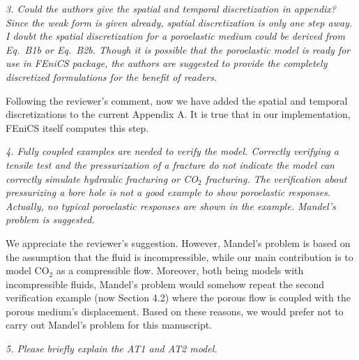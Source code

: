 \documentclass{elsarticle}
\newcommand{\review}[1]{ \textit{#1}}
\begin{document}
{{%
\bigskip

    \review{3. Could the authors give the spatial and temporal discretization in appendix? Since the weak form is given already, spatial discretization is only one step away. I doubt the spatial discretization for a poroelastic medium could be derived from Eq.~B1b or Eq.~B2b. Though it is possible that the poroelastic model is ready for use in FEniCS package, the authors are suggested to provide the completely discretized formulations for the benefit of readers.}
    
{Following the reviewer's comment, now we have added the spatial and temporal discretizations to the current Appendix A. It is true that in our implementation, FEniCS itself computes this step.}

\bigskip
    \review{4. Fully coupled examples are needed to verify the model. Correctly verifying a tensile test and the pressurization of a fracture do not indicate the model can correctly simulate hydraulic fracturing or CO$_2$ fracturing. The verification about pressurizing a bore hole is not a good example to show poroelastic responses. Actually, no typical poroelastic responses are shown in the example. Mandel's problem is suggested.}




We appreciate the reviewer's suggestion. However, Mandel's problem is based on the assumption that the fluid is incompressible, while our main contribution is to model CO$_2$ as a compressible flow. Moreover, both being models with incompressible fluids, Mandel's problem would somehow repeat the second verification example (now Section 4.2) where the porous flow is coupled with the porous medium's displacement. Based on these reasons, we would prefer not to carry out Mandel's problem for this manuscript.

\bigskip
    \review{5. Please briefly explain the AT1 and AT2 model.}

}}
\end{document}
